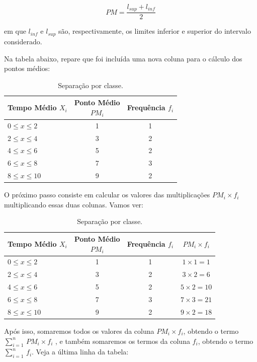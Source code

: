 \[
  PM=\frac{l_{sup}+l_{inf}}{2}
\]

em que \(l_{inf}\) e \(l_{sup}\) são, respectivamente, os limites inferior e superior do intervalo considerado.

Na tabela abaixo, repare que foi incluída uma nova coluna para o cálculo dos pontos médios:

\begin{table}[H]
    \centering
\begin{tabular}{lcc}
\toprule
\shortstack{Tempo \\Médio \(X_i\)} & \shortstack{Ponto Médio \\\(PM_i\)} &Frequência \(f_i\)\\
\midrule
0\(\leq x \le 2\)    &1  &1\\
2\(\leq x \le 4\)    &3  &2\\
4\(\leq x \le 6\)    &5  &2\\
6\(\leq x \le 8\)    &7  &3\\
8\(\leq x \le 10\)   &9  &2\\
\bottomrule
\end{tabular}
\caption{Separação por classe.}
\end{table}

O próximo passo consiste em calcular os valores das multiplicações \(PM_i\times f_i\) multiplicando essas duas colunas. Vamos ver:
\begin{table}[H]
    \centering
\begin{tabular}{lccc}
\toprule
\shortstack{Tempo \\Médio \(X_i\)} & \shortstack{Ponto Médio \\\(PM_i\)} &Frequência \(f_i\)    & \(PM_i\times f_i\)\\
\midrule
0\(\leq x \le 2\)    &1  &1 &\(1\times1=1\)\\
2\(\leq x \le 4\)    &3  &2 &\(3\times2=6\)\\
4\(\leq x \le 6\)    &5  &2 &\(5\times2=10\)\\
6\(\leq x \le 8\)    &7  &3 &\(7\times3=21\)\\
8\(\leq x \le 10\)   &9  &2 &\(9\times2=18\)\\
\bottomrule
\end{tabular}
\caption{Separação por classe.}
\end{table}

Após isso, somaremos todos os valores da coluna \(PM_i\times f_i\), obtendo o termo \(\sum_{i=1}^{n}\,PM_i\times f_i\) , e também somaremos os termos da coluna \(f_i\), obtendo o termo \(\sum_{i=1}^{n}\,f_i\). Veja a última linha da tabela:

